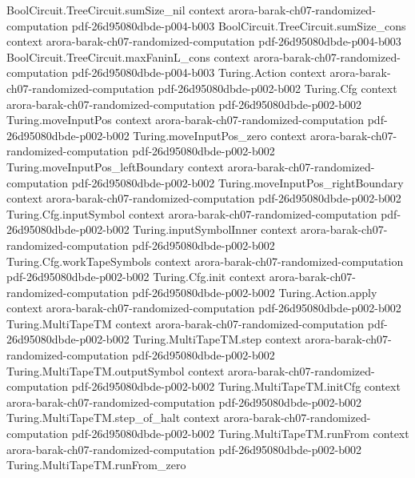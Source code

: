 \begin{theorem}
\proofstep
  {BoolCircuit.TreeCircuit.sumSize_nil}
  {context}
  {arora-barak-ch07-randomized-computation}
  {pdf-26d95080dbde-p004-b003}
\proofstep
  {BoolCircuit.TreeCircuit.sumSize_cons}
  {context}
  {arora-barak-ch07-randomized-computation}
  {pdf-26d95080dbde-p004-b003}
\proofstep
  {BoolCircuit.TreeCircuit.maxFaninL_cons}
  {context}
  {arora-barak-ch07-randomized-computation}
  {pdf-26d95080dbde-p004-b003}
\proofstep
  {Turing.Action}
  {context}
  {arora-barak-ch07-randomized-computation}
  {pdf-26d95080dbde-p002-b002}
\proofstep
  {Turing.Cfg}
  {context}
  {arora-barak-ch07-randomized-computation}
  {pdf-26d95080dbde-p002-b002}
\proofstep
  {Turing.moveInputPos}
  {context}
  {arora-barak-ch07-randomized-computation}
  {pdf-26d95080dbde-p002-b002}
\proofstep
  {Turing.moveInputPos_zero}
  {context}
  {arora-barak-ch07-randomized-computation}
  {pdf-26d95080dbde-p002-b002}
\proofstep
  {Turing.moveInputPos_leftBoundary}
  {context}
  {arora-barak-ch07-randomized-computation}
  {pdf-26d95080dbde-p002-b002}
\proofstep
  {Turing.moveInputPos_rightBoundary}
  {context}
  {arora-barak-ch07-randomized-computation}
  {pdf-26d95080dbde-p002-b002}
\proofstep
  {Turing.Cfg.inputSymbol}
  {context}
  {arora-barak-ch07-randomized-computation}
  {pdf-26d95080dbde-p002-b002}
\proofstep
  {Turing.inputSymbolInner}
  {context}
  {arora-barak-ch07-randomized-computation}
  {pdf-26d95080dbde-p002-b002}
\proofstep
  {Turing.Cfg.workTapeSymbols}
  {context}
  {arora-barak-ch07-randomized-computation}
  {pdf-26d95080dbde-p002-b002}
\proofstep
  {Turing.Cfg.init}
  {context}
  {arora-barak-ch07-randomized-computation}
  {pdf-26d95080dbde-p002-b002}
\proofstep
  {Turing.Action.apply}
  {context}
  {arora-barak-ch07-randomized-computation}
  {pdf-26d95080dbde-p002-b002}
\proofstep
  {Turing.MultiTapeTM}
  {context}
  {arora-barak-ch07-randomized-computation}
  {pdf-26d95080dbde-p002-b002}
\proofstep
  {Turing.MultiTapeTM.step}
  {context}
  {arora-barak-ch07-randomized-computation}
  {pdf-26d95080dbde-p002-b002}
\proofstep
  {Turing.MultiTapeTM.outputSymbol}
  {context}
  {arora-barak-ch07-randomized-computation}
  {pdf-26d95080dbde-p002-b002}
\proofstep
  {Turing.MultiTapeTM.initCfg}
  {context}
  {arora-barak-ch07-randomized-computation}
  {pdf-26d95080dbde-p002-b002}
\proofstep
  {Turing.MultiTapeTM.step_of_halt}
  {context}
  {arora-barak-ch07-randomized-computation}
  {pdf-26d95080dbde-p002-b002}
\proofstep
  {Turing.MultiTapeTM.runFrom}
  {context}
  {arora-barak-ch07-randomized-computation}
  {pdf-26d95080dbde-p002-b002}
\proofstep
  {Turing.MultiTapeTM.runFrom_zero}

\end{theorem}
